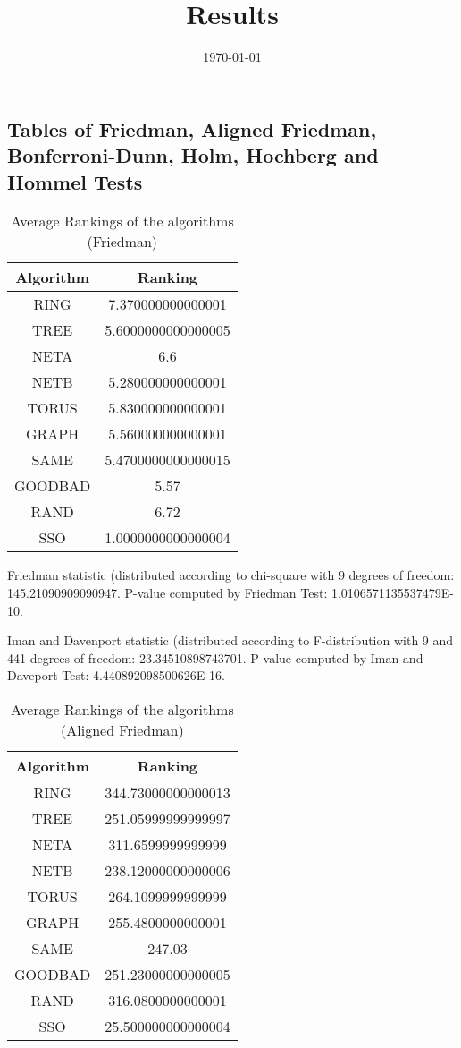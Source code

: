 \documentclass[a4paper,10pt]{article}
\title{Results}
\author{}
\date{\today}
\begin{document}
\begin{landscape}
\oddsidemargin 0in \topmargin 0in\maketitle
\section{Tables of Friedman, Aligned Friedman, Bonferroni-Dunn, Holm, Hochberg and Hommel Tests}
\begin{table}[!htp]
\centering
\caption{Average Rankings of the algorithms (Friedman)
}\begin{tabular}{c|c}
Algorithm&Ranking\\
\hline
 RING&7.370000000000001\\
 TREE&5.6000000000000005\\
 NETA&6.6\\
 NETB&5.280000000000001\\
 TORUS&5.830000000000001\\
 GRAPH&5.560000000000001\\
 SAME&5.4700000000000015\\
 GOODBAD&5.57\\
 RAND&6.72\\
 SSO&1.0000000000000004\\
\end{tabular}
\end{table}


Friedman statistic (distributed according to chi-square with 9 degrees of freedom: 145.21090909090947. 
P-value computed by Friedman Test: 1.0106571135537479E-10.\newline

Iman and Davenport statistic (distributed according to F-distribution with 9 and 441 degrees of freedom: 23.34510898743701. 
P-value computed by Iman and Daveport Test: 4.440892098500626E-16.\newline


\newpage

\begin{table}[!htp]
\centering
\caption{Average Rankings of the algorithms (Aligned Friedman)
}\begin{tabular}{c|c}
Algorithm&Ranking\\
\hline
 RING&344.73000000000013\\
 TREE&251.05999999999997\\
 NETA&311.6599999999999\\
 NETB&238.12000000000006\\
 TORUS&264.1099999999999\\
 GRAPH&255.4800000000001\\
 SAME&247.03\\
 GOODBAD&251.23000000000005\\
 RAND&316.0800000000001\\
 SSO&25.500000000000004\\
\end{tabular}
\end{table}



\end{landscape}
\end{document}
